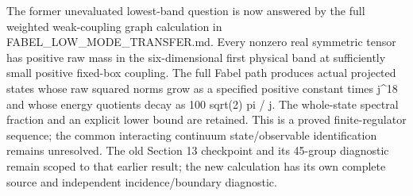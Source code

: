 The former unevaluated lowest-band question is now answered by the full
weighted weak-coupling graph calculation in
FABEL\_LOW\_MODE\_TRANSFER.md. Every nonzero real symmetric tensor has
positive raw mass in the six-dimensional first physical band at
sufficiently small positive fixed-box coupling. The full Fabel path
produces actual projected states whose raw squared norms grow as a
specified positive constant times j\^{}18 and whose energy quotients
decay as 100 sqrt(2) pi / j. The whole-state spectral fraction and an
explicit lower bound are retained. This is a proved finite-regulator
sequence; the common interacting continuum state/observable
identification remains unresolved. The old Section 13 checkpoint and its
45-group diagnostic remain scoped to that earlier result; the new
calculation has its own complete source and independent
incidence/boundary diagnostic.
